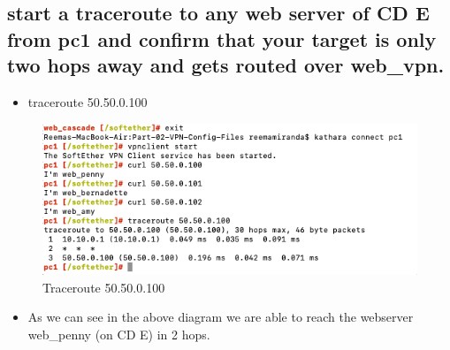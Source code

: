 \subsection{start a traceroute to any web server of CD E from pc1 and
confirm that your target is only two hops away and gets routed over web\_vpn.}
\begin{itemize}
    \item traceroute 50.50.0.100
\end{itemize}
\begin{figure}[H]
\centering
  \includegraphics[width=1\textwidth]{Images/traceroute web penny.png}
  \caption{Traceroute 50.50.0.100}
  \label{fig }
\end{figure}
\begin{itemize}
    \item As we can see in the above diagram we are able to reach the webserver web\_penny (on CD E) in 2 hops.
\end{itemize}
